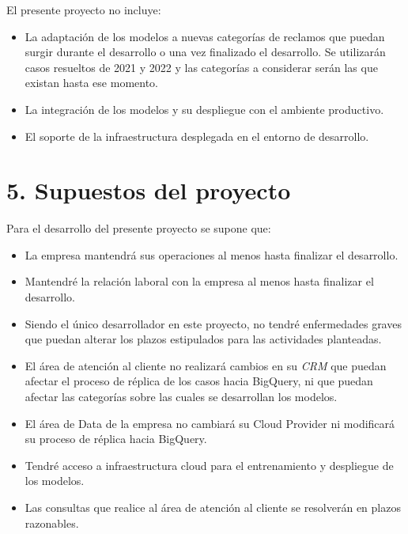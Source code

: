 \documentclass[
11pt, %
]{charter}
\begin{document}
El presente proyecto no incluye:

\begin{itemize}
	\item La adaptación de los modelos a nuevas categorías de reclamos que puedan surgir durante el desarrollo o una vez finalizado el desarrollo. Se utilizarán casos resueltos de 2021 y 2022 y las categorías a considerar serán las que existan hasta ese momento. 
	\item La integración de los modelos y su despliegue con el ambiente productivo.
	\item El soporte de la infraestructura desplegada en el entorno de desarrollo.
\end{itemize}



\section{5. Supuestos del proyecto}
\label{sec:supuestos}

Para el desarrollo del presente proyecto se supone que:

\begin{itemize}
	\item La empresa mantendrá sus operaciones al menos hasta finalizar el desarrollo.
	\item Mantendré la relación laboral con la empresa al menos hasta finalizar el desarrollo.
	\item Siendo el único desarrollador en este proyecto, no tendré enfermedades graves que puedan alterar los plazos estipulados para las actividades planteadas.
	\item El área de atención al cliente no realizará cambios en su \textit{CRM} que puedan afectar el proceso de réplica de los casos hacia BigQuery, ni que puedan afectar las categorías sobre las cuales se desarrollan los modelos.
	\item El área de Data de la empresa no cambiará su Cloud Provider ni modificará su proceso de réplica hacia BigQuery.
	\item Tendré acceso a infraestructura cloud para el entrenamiento y despliegue de los modelos.
	\item Las consultas que realice al área de atención al cliente se resolverán en plazos razonables.
	
\end{itemize}
\end{document}
